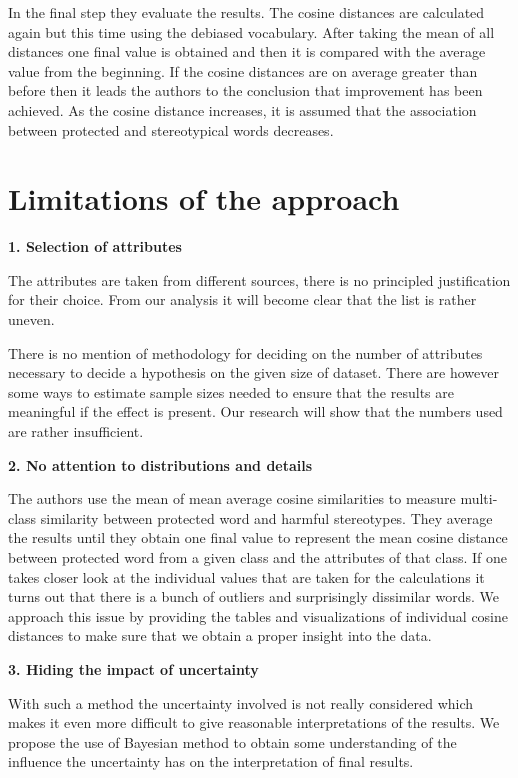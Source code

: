 \documentclass[12pt,]{book}
\begin{document}
In the final step they evaluate the results. The cosine distances are
calculated again but this time using the debiased vocabulary. After
taking the mean of all distances one final value is obtained and then it
is compared with the average value from the beginning. If the cosine
distances are on average greater than before then it leads the authors
to the conclusion that improvement has been achieved. As the cosine
distance increases, it is assumed that the association between protected
and stereotypical words decreases.

\section{Limitations of the approach}\label{limitations-of-the-approach}

\textbf{1. Selection of attributes}

The attributes are taken from different sources, there is no principled
justification for their choice. From our analysis it will become clear
that the list is rather uneven.

There is no mention of methodology for deciding on the number of
attributes necessary to decide a hypothesis on the given size of
dataset. There are however some ways to estimate sample sizes needed to
ensure that the results are meaningful if the effect is present. Our
research will show that the numbers used are rather insufficient.

\textbf{2. No attention to distributions and details}

The authors use the mean of mean average cosine similarities to measure
multi-class similarity between protected word and harmful stereotypes.
They average the results until they obtain one final value to represent
the mean cosine distance between protected word from a given class and
the attributes of that class. If one takes closer look at the individual
values that are taken for the calculations it turns out that there is a
bunch of outliers and surprisingly dissimilar words. We approach this
issue by providing the tables and visualizations of individual cosine
distances to make sure that we obtain a proper insight into the data.

\textbf{3. Hiding the impact of uncertainty}

With such a method the uncertainty involved is not really considered
which makes it even more difficult to give reasonable interpretations of
the results. We propose the use of Bayesian method to obtain some
understanding of the influence the uncertainty has on the interpretation
of final results.
\end{document}
